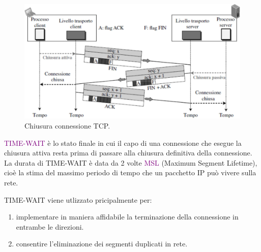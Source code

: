 \begin{figure}[h]
    \centering
    \includegraphics[scale=0.35]{Immagini/ChiusuraConnessioneTCP.png}
    \caption{Chiusura connessione TCP.}
\end{figure}

\begin{definition} 
    \textcolor{purple}{TIME-WAIT} è lo stato finale in cui il capo di una connessione che esegue la chiusura attiva resta prima di passare alla chiusura definitiva della connessione.
    La durata di TIME-WAIT è data da 2 volte \textcolor{purple}{MSL} (Maximum Segment Lifetime), cioè la stima del massimo periodo di tempo che un pacchetto IP può vivere sulla rete.
\end{definition}

TIME-WAIT viene utlizzato pricipalmente per:
\begin{enumerate}
    \item implementare in maniera affidabile la terminazione della connessione in entrambe le direzioni.
    \item consentire l'eliminazione dei segmenti duplicati in rete.
\end{enumerate}

\newpage

